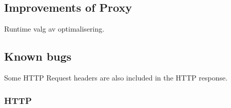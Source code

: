 \subsection{Improvements of Proxy}

Runtime valg av optimalisering.




\subsection{Known bugs}

Some HTTP Request headers are also included in the HTTP response.

\subsubsection{HTTP}
